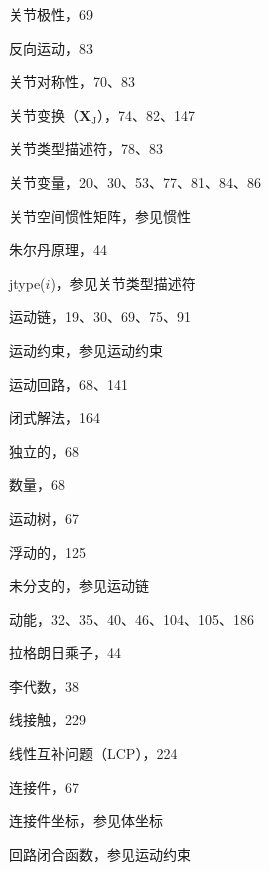 \documentclass[10pt,a4paper]{book}
\theoremstyle{thmstyle} %
\theoremstyle{defstyle} %
\theoremstyle{prostyle} %
\begin{document}
关节极性，69



反向运动，83



关节对称性，70、83



关节变换（$\mathbf{X}_{\mathrm{J}}$），74、82、147



关节类型描述符，78、83



关节变量，20、30、53、77、81、84、86



关节空间惯性矩阵，参见惯性



朱尔丹原理，44



jtype($i$)，参见关节类型描述符



运动链，19、30、69、75、91



运动约束，参见运动约束



运动回路，68、141



闭式解法，164



独立的，68



数量，68



运动树，67



浮动的，125



未分支的，参见运动链



动能，32、35、40、46、104、105、186



拉格朗日乘子，44



李代数，38



线接触，229



线性互补问题（LCP），224



连接件，67



连接件坐标，参见体坐标



回路闭合函数，参见运动约束
\end{document}
